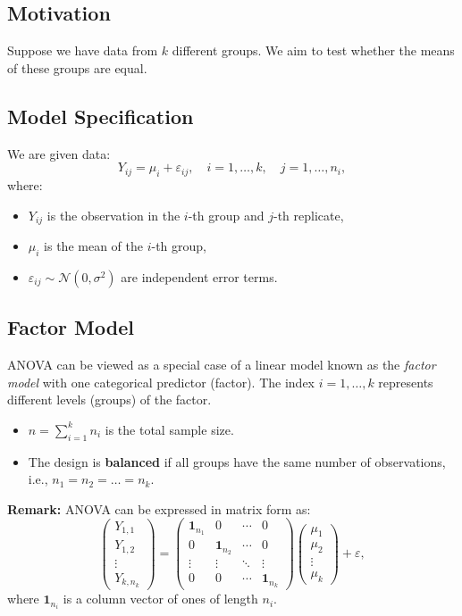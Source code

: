 \documentclass[open=any, 11pt,paper=A4]{scrreprt}
\begin{document}
\subsection{Motivation}

Suppose we have data from $k$ different groups. We aim to test whether the means of these groups are equal.

\subsection{Model Specification}

We are given data:
\[
Y_{ij} = \mu_i + \varepsilon_{ij}, \quad i = 1, \ldots, k, \quad j = 1, \ldots, n_i,
\]
where:
\begin{itemize}
    \item $Y_{ij}$ is the observation in the $i$-th group and $j$-th replicate,
    \item $\mu_i$ is the mean of the $i$-th group,
    \item $\varepsilon_{ij} \sim \mathcal{N}(0, \sigma^2)$ are independent error terms.
\end{itemize}

\subsection{Factor Model}

ANOVA can be viewed as a special case of a linear model known as the \textit{factor model} with one categorical predictor (factor). The index $i = 1, \ldots, k$ represents different levels (groups) of the factor.

\begin{itemize}
    \item $n = \sum_{i=1}^k n_i$ is the total sample size.
    \item The design is \textbf{balanced} if all groups have the same number of observations, i.e., $n_1 = n_2 = \ldots = n_k$.
\end{itemize}

\textbf{Remark:} ANOVA can be expressed in matrix form as:
\[
\begin{pmatrix}
Y_{1,1} \\
Y_{1,2} \\
\vdots \\
Y_{k,n_k}
\end{pmatrix}
=
\begin{pmatrix}
\mathbf{1}_{n_1} & 0 & \cdots & 0 \\
0 & \mathbf{1}_{n_2} & \cdots & 0 \\
\vdots & \vdots & \ddots & \vdots \\
0 & 0 & \cdots & \mathbf{1}_{n_k}
\end{pmatrix}
\begin{pmatrix}
\mu_1 \\
\mu_2 \\
\vdots \\
\mu_k
\end{pmatrix}
+
\varepsilon,
\]
where $\mathbf{1}_{n_i}$ is a column vector of ones of length $n_i$.
\end{document}
